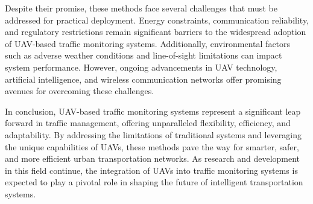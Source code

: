 \vspace{\baselineskip} %

Despite their promise, these methods face several challenges that must be addressed for practical deployment. Energy constraints, communication reliability, and regulatory restrictions remain significant barriers to the widespread adoption of UAV-based traffic monitoring systems. Additionally, environmental factors such as adverse weather conditions and line-of-sight limitations can impact system performance. However, ongoing advancements in UAV technology, artificial intelligence, and wireless communication networks offer promising avenues for overcoming these challenges.

\vspace{\baselineskip} %

In conclusion, UAV-based traffic monitoring systems represent a significant leap forward in traffic management, offering unparalleled flexibility, efficiency, and adaptability. By addressing the limitations of traditional systems and leveraging the unique capabilities of UAVs, these methods pave the way for smarter, safer, and more efficient urban transportation networks. As research and development in this field continue, the integration of UAVs into traffic monitoring systems is expected to play a pivotal role in shaping the future of intelligent transportation systems.
